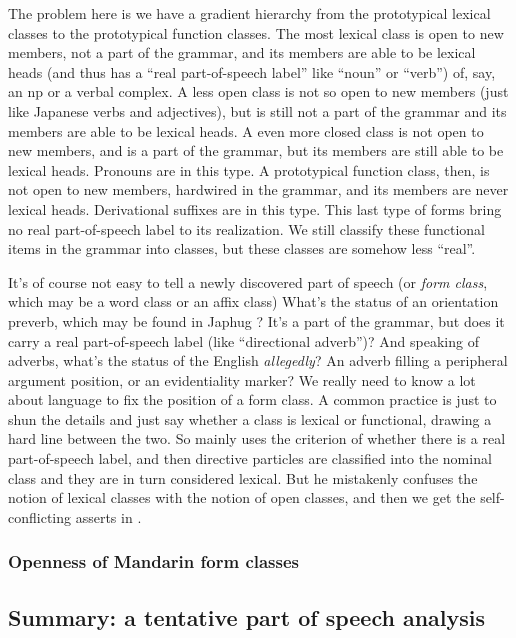 \documentclass[UTF8, a4paper, oneside, scheme=plain]{ctexrep}
\newcommand*{\citesec}[1]{\S~{#1}}
\newcommand*{\term}[1]{\emph{#1}}
\newcommand{\corpus}[1]{\emph{#1}}
\begin{document}
The problem here is we have a gradient hierarchy 
from the prototypical lexical classes 
to the prototypical function classes.
The most lexical class is open to new members, 
not a part of the grammar,
and its members are able to be lexical heads
(and thus has a ``real part-of-speech label'' 
like ``noun'' or ``verb'') 
of, say, an \acs{np} or a verbal complex.
A less open class is not so open to new members 
(just like Japanese verbs and adjectives),
but is still not a part of the grammar 
and its members are able to be lexical heads. 
A even more closed class is not open to new members,
and is a part of the grammar,
but its members are still able to be lexical heads.
Pronouns are in this type.
A prototypical function class, then, 
is not open to new members, hardwired in the grammar, 
and its members are never lexical heads.
Derivational suffixes are in this type.
This last type of forms 
bring no real part-of-speech label to its realization.
We still classify these functional items in the grammar into classes,
but these classes are somehow less ``real''.

It's of course not easy to tell a newly discovered part of speech 
(or \term{form class}, which may be a word class or an affix class)
What's the status of an orientation preverb, 
which may be found in Japhug \citep{jacques2021grammar}?
It's a part of the grammar,
but does it carry a real part-of-speech label (like ``directional adverb'')?
And speaking of adverbs, what's the status of the English \corpus{allegedly}?
An adverb filling a peripheral argument position,
or an evidentiality marker?
We really need to know a lot about language to fix the position of a form class.
A common practice is just to shun the details and just say whether a class is lexical or functional,
drawing a hard line between the two.
So \citet{zhudexigrammar} mainly uses the criterion of whether there is a real part-of-speech label,
and then directive particles are classified into the nominal class 
and they are in turn considered lexical.
But he mistakenly confuses the notion of lexical classes with the notion of open classes,
and then we get the self-conflicting asserts in \citet[\citesec{3.4}]{zhudexigrammar}.

\subsubsection{Openness of Mandarin form classes}

\subsection{Summary: a tentative part of speech analysis}
\end{document}
